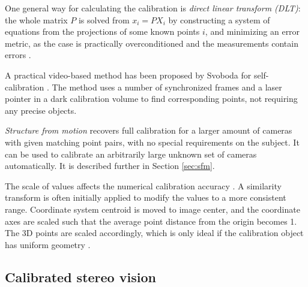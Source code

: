 One general way for calculating the calibration is \emph{direct linear transform (DLT)}:
the whole matrix $P$ is solved from $x_i = PX_i$ by constructing a system of equations from the projections of some known points $i$, and minimizing an error metric, as the case is practically overconditioned and the measurements contain errors \cite{hartley03multiview}.

A practical video-based method has been proposed by Svoboda for self-calibration \cite{svoboda2005convenient}.
The method uses a number of synchronized frames and a laser pointer in a dark calibration volume to find corresponding points, not requiring any precise objects.

\emph{Structure from motion} recovers full calibration for a larger amount of cameras with given matching point pairs, with no special requirements on the subject.
It can be used to calibrate an arbitrarily large unknown set of cameras automatically.
It is described further in Section \ref{sec:sfm}.





The scale of values affects the numerical calibration accuracy \cite{hartley1997defense,hartley03multiview}.
A similarity transform is often initially applied to modify the values to a more consistent range.
Coordinate system centroid is moved to image center, and the coordinate axes are scaled such that the average point distance from the origin becomes 1.
The 3D points are scaled accordingly, which is only ideal if the calibration object has uniform geometry \cite{hartley03multiview}.


\subsection{Calibrated stereo vision} %

